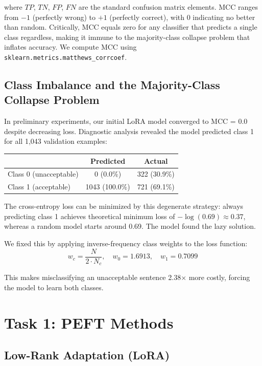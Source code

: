 \documentclass[12pt,a4paper]{article}
\theoremstyle{definition}
\begin{document}
where $TP$, $TN$, $FP$, $FN$ are the standard confusion matrix elements. MCC ranges from $-1$ (perfectly wrong) to $+1$ (perfectly correct), with $0$ indicating no better than random. Critically, MCC equals zero for any classifier that predicts a single class regardless, making it immune to the majority-class collapse problem that inflates accuracy. We compute MCC using \texttt{sklearn.metrics.matthews\_corrcoef}.

\subsection{Class Imbalance and the Majority-Class Collapse Problem}

In preliminary experiments, our initial LoRA model converged to MCC = 0.0 despite decreasing loss. Diagnostic analysis revealed the model predicted class 1 for all 1,043 validation examples:

\begin{center}
\begin{tabular}{lcc}
\toprule
& Predicted & Actual \\
\midrule
Class 0 (unacceptable) & 0 (0.0\%) & 322 (30.9\%) \\
Class 1 (acceptable) & 1043 (100.0\%) & 721 (69.1\%) \\
\bottomrule
\end{tabular}
\end{center}

The cross-entropy loss can be minimized by this degenerate strategy: always predicting class 1 achieves theoretical minimum loss of $-\log(0.69) \approx 0.37$, whereas a random model starts around 0.69. The model found the lazy solution.

We fixed this by applying inverse-frequency class weights to the loss function:
\begin{equation}
w_c = \frac{N}{2 \cdot N_c}, \quad w_0 = 1.6913, \quad w_1 = 0.7099
\end{equation}

This makes misclassifying an unacceptable sentence 2.38× more costly, forcing the model to learn both classes.

\section{Task 1: PEFT Methods}

\subsection{Low-Rank Adaptation (LoRA)}
\end{document}

